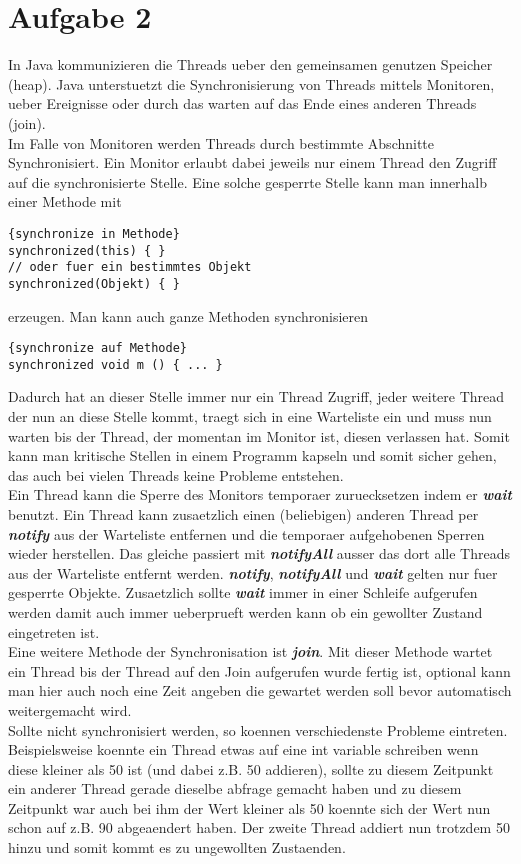 \documentclass[12pt]{scrartcl}
\begin{document}
\section*{Aufgabe 2}
In Java kommunizieren die Threads ueber den gemeinsamen genutzen Speicher (heap).
Java unterstuetzt die Synchronisierung von Threads mittels Monitoren, ueber Ereignisse 
oder durch das warten auf das Ende eines anderen Threads (join).
\\
Im Falle von Monitoren werden Threads durch bestimmte Abschnitte Synchronisiert. Ein
Monitor erlaubt dabei jeweils nur einem Thread den Zugriff auf die synchronisierte Stelle. 
Eine solche gesperrte Stelle kann man innerhalb einer Methode mit

\begin{lstlisting}{synchronize in Methode}
synchronized(this) { }
// oder fuer ein bestimmtes Objekt
synchronized(Objekt) { }
\end{lstlisting}

erzeugen. Man kann auch ganze Methoden synchronisieren

\begin{lstlisting}{synchronize auf Methode}
synchronized void m () { ... }
\end{lstlisting}

Dadurch hat an dieser Stelle immer nur ein Thread Zugriff, jeder weitere Thread der nun an 
diese Stelle kommt, traegt sich in eine Warteliste ein und muss nun warten bis der Thread, der
momentan im Monitor ist, diesen verlassen hat. Somit kann man kritische Stellen in einem Programm
kapseln und somit sicher gehen, das auch bei vielen Threads keine Probleme entstehen.
\\
Ein Thread kann die Sperre des Monitors temporaer zuruecksetzen indem er \textbf{\textit{wait}} 
benutzt. Ein Thread kann zusaetzlich einen (beliebigen) anderen Thread per \textbf{\textit{notify}} 
aus der Warteliste entfernen und die temporaer aufgehobenen Sperren wieder herstellen. Das gleiche 
passiert mit \textbf{\textit{notifyAll}} ausser das dort alle Threads aus der Warteliste entfernt werden. 
\textbf{\textit{notify}}, \textbf{\textit{notifyAll}} und \textbf{\textit{wait}} gelten nur fuer 
gesperrte Objekte. Zusaetzlich sollte \textbf{\textit{wait}} immer in einer Schleife aufgerufen werden 
damit auch immer ueberprueft werden kann ob ein gewollter Zustand eingetreten ist.
\\
Eine weitere Methode der Synchronisation ist \textbf{\textit{join}}. Mit dieser Methode wartet ein Thread 
bis der Thread auf den Join aufgerufen wurde fertig ist, optional kann man hier auch noch eine Zeit angeben 
die gewartet werden soll bevor automatisch weitergemacht wird.
\\
Sollte nicht synchronisiert werden, so koennen verschiedenste Probleme eintreten. Beispielsweise koennte 
ein Thread etwas auf eine int variable schreiben wenn diese kleiner als 50 ist (und dabei z.B. 50 addieren), 
sollte zu diesem Zeitpunkt ein anderer Thread gerade dieselbe abfrage gemacht haben und zu diesem Zeitpunkt war 
auch bei ihm der Wert kleiner als 50 koennte sich der Wert nun schon auf z.B. 90 abgeaendert haben. Der zweite 
Thread addiert nun trotzdem 50 hinzu und somit kommt es zu ungewollten Zustaenden.
\end{document}
